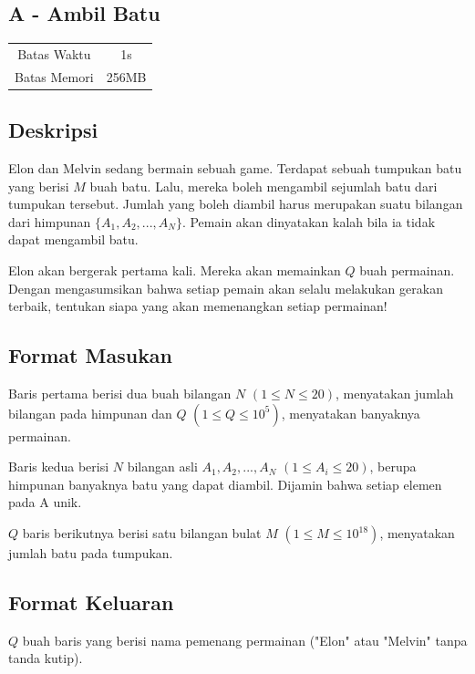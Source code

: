 \documentclass{article}
\begin{document}
\begin{center}
    \section*{A - Ambil Batu} %

    \begin{tabular}{ | c c | }
        \hline
        Batas Waktu  & 1s \\    %
        Batas Memori & 256MB \\  %
        \hline
    \end{tabular}
\end{center}

\subsection*{Deskripsi}

Elon dan Melvin sedang bermain sebuah game. Terdapat sebuah tumpukan batu yang berisi $M$ buah batu. Lalu, mereka boleh mengambil sejumlah batu dari tumpukan tersebut. Jumlah yang boleh diambil harus merupakan suatu bilangan dari himpunan $\{A_1, A_2, ..., A_N\}$. Pemain akan dinyatakan kalah bila ia tidak dapat mengambil batu.

Elon akan bergerak pertama kali. Mereka akan memainkan $Q$ buah permainan. Dengan mengasumsikan bahwa setiap pemain akan selalu melakukan gerakan terbaik, tentukan siapa yang akan memenangkan setiap permainan!

\subsection*{Format Masukan}
Baris pertama berisi dua buah bilangan $N$ $(1 \leq N \leq 20)$, menyatakan jumlah bilangan pada himpunan dan $Q$ $(1 \leq Q \leq 10^5)$, menyatakan banyaknya permainan.

Baris kedua berisi $N$ bilangan asli $A_1, A_2, ..., A_N$ $(1 \leq A_i \leq 20)$, berupa himpunan banyaknya batu yang dapat diambil. Dijamin bahwa setiap elemen pada A unik.

$Q$ baris berikutnya berisi satu bilangan bulat $M$ $(1 \leq M \leq 10^{18})$, menyatakan jumlah batu pada tumpukan.\\

\subsection*{Format Keluaran}
$Q$ buah baris yang berisi nama pemenang permainan ("Elon" atau "Melvin" tanpa tanda kutip).
\end{document}
